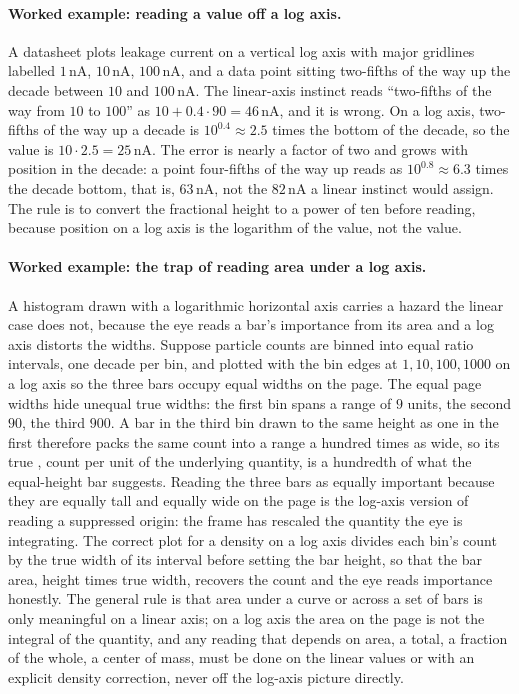 \paragraph{Worked example: reading a value off a log axis.}
A datasheet plots leakage current on a vertical log axis with major
gridlines labelled $1\,\si{\nano\ampere}$, $10\,\si{\nano\ampere}$,
$100\,\si{\nano\ampere}$, and a data point sitting two-fifths of the
way up the decade between $10$ and $100\,\si{\nano\ampere}$. The
linear-axis instinct reads ``two-fifths of the way from $10$ to
$100$'' as $10 + 0.4 \cdot 90 = 46\,\si{\nano\ampere}$, and it is
wrong. On a log axis, two-fifths of the way up a decade is
$10^{0.4} \approx 2.5$ times the bottom of the decade, so the value
is $10 \cdot 2.5 = 25\,\si{\nano\ampere}$. The error is nearly a
factor of two and grows with position in the decade: a point
four-fifths of the way up reads as $10^{0.8} \approx 6.3$ times the
decade bottom, that is, $63\,\si{\nano\ampere}$, not the
$82\,\si{\nano\ampere}$ a linear instinct would assign. The rule is
to convert the fractional height to a power of ten before reading,
because position on a log axis is the logarithm of the value, not the
value.

\paragraph{Worked example: the trap of reading area under a log axis.}
A histogram drawn with a logarithmic horizontal axis carries a hazard
the linear case does not, because the eye reads a bar's importance from
its area and a log axis distorts the widths. Suppose particle counts are
binned into equal ratio intervals, one decade per bin, and plotted with
the bin edges at $1, 10, 100, 1000$ on a log axis so the three bars
occupy equal widths on the page. The equal page widths hide unequal true
widths: the first bin spans a range of $9$ units, the second $90$, the
third $900$. A bar in the third bin drawn to the same height as one in
the first therefore packs the same count into a range a hundred times as
wide, so its true , count per unit of the underlying
quantity, is a hundredth of what the equal-height bar suggests. Reading
the three bars as equally important because they are equally tall and
equally wide on the page is the log-axis version of reading a suppressed
origin: the frame has rescaled the quantity the eye is integrating. The
correct plot for a density on a log axis divides each bin's count by the
true width of its interval before setting the bar height, so that the
bar area, height times true width, recovers the count and the eye reads
importance honestly. The general rule is that area under a curve or
across a set of bars is only meaningful on a linear axis; on a log axis
the area on the page is not the integral of the quantity, and any
reading that depends on area, a total, a fraction of the whole, a
center of mass, must be done on the linear values or with an explicit
density correction, never off the log-axis picture directly.

